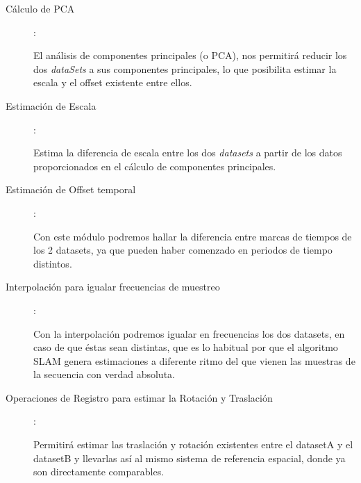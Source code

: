 \begin{description}
\item [Cálculo de PCA]:

El análisis de componentes principales (o PCA), nos permitirá reducir los dos  \textit{dataSets} a sus componentes principales, lo que posibilita estimar la escala y el offset existente entre ellos.
\item [Estimación de Escala]: 

Estima la diferencia de escala entre los dos \textit{datasets} a partir de los datos proporcionados en el cálculo de componentes principales.
\item [Estimación de Offset temporal]: 

Con este módulo podremos hallar la diferencia entre marcas de tiempos de los 2 datasets, ya que pueden haber comenzado en periodos de tiempo distintos.
\item [Interpolación para igualar frecuencias de muestreo]: 

Con la interpolación podremos igualar en frecuencias los dos datasets, en caso de que éstas sean distintas, que es lo habitual por que el algoritmo SLAM genera estimaciones a diferente ritmo del que vienen las muestras de la secuencia con verdad absoluta.

\item [Operaciones de Registro para estimar la Rotación y Traslación]: 

Permitirá estimar las traslación y rotación existentes entre el datasetA y el datasetB y llevarlas así al mismo sistema de referencia espacial, donde ya son directamente comparables.
\end{description}


